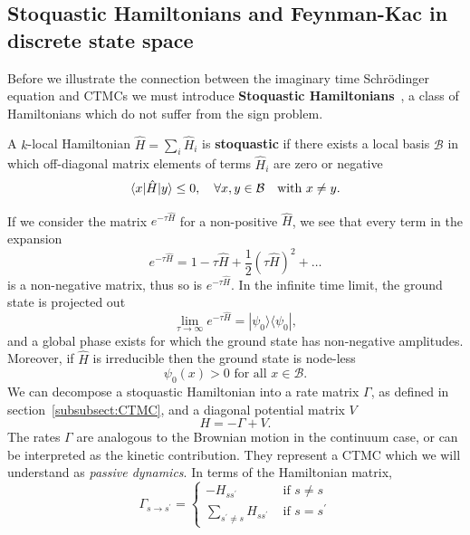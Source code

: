 \subsection{Stoquastic Hamiltonians and Feynman-Kac in discrete state space}
\label{subsec:fk-latt}
Before we illustrate the connection between the imaginary time Schr\" odinger equation and CTMCs we must introduce \textbf{Stoquastic Hamiltonians}~\cite{bravyi2006complexity}, a class of Hamiltonians which do not suffer from the sign problem.
\begin{definition}
	A $k$-local Hamiltonian $\hat H=\sum_{i} \hat H_{i}$ is \textbf{stoquastic} if there exists a local basis $\mathcal{B}$ in which off-diagonal matrix elements of terms $\hat{H}_i$ are zero or negative
	\begin{equation}
		\langle x|\hat H| y\rangle \leq 0, \quad \forall x, y \in \mathcal{B} \text {\quad with } x \neq y.
	\end{equation}
\end{definition}
\noindent
If we consider the matrix $e^{-\tau \hat H}$ for a non-positive $\hat H$, we see that every term in the expansion
\begin{equation}
	e^{-\tau \hat{H}} = 1 -\tau \hat{H} + \frac{1}{2}(\tau \hat{H})^2 + \ldots
\end{equation}
is a non-negative matrix, thus so is $e^{-\tau \hat H}$. In the infinite time limit, the ground state is projected out
\begin{equation}
	\lim _{\tau \rightarrow \infty} e^{-\tau \hat H}=|\psi_0\rangle\langle\psi_0|, 
\end{equation}
and a global phase exists for which the ground state has non-negative amplitudes. Moreover, if $\hat H$ is irreducible then the ground state is node-less~\cite{discussion_stoquastic2017}
\begin{equation}
	\psi_0(x)>0 \text { for all } x \in \mathcal{B}.
\end{equation}
We can decompose a stoquastic Hamiltonian into a rate matrix $\Gamma$, as defined in section~\ref{subsubsect:CTMC}, and a diagonal potential matrix $V$
\begin{equation}
	\label{eq:hamilton_split}
	H=-\Gamma+V.
\end{equation}
The rates $\Gamma$ are analogous to the Brownian motion in the continuum case, or can be interpreted as the kinetic contribution. They represent a CTMC which we will understand as \emph{passive dynamics}. In terms of the Hamiltonian matrix,
\begin{equation}
\Gamma_{s \rightarrow s^{\prime}}=\left\{\begin{array}{ll}
-H_{s s^{\prime}} & \text { if } s \neq s \\
\sum_{s^{\prime} \neq s} H_{s s^{\prime}} & \text { if } s=s^{\prime}
\end{array}\right.
\end{equation}
